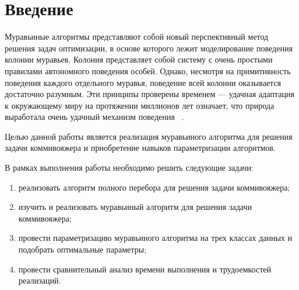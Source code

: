 \chapter*{Введение}

Муравьиные алгоритмы представляют собой новый перспективный метод решения задач оптимизации, в основе которого лежит моделирование поведения колонии муравьев. Колония представляет собой систему с очень простыми правилами автономного поведения особей. Однако, несмотря на примитивность поведения каждого отдельного муравья, поведение всей колонии оказывается достаточно разумным. Эти принципы проверены временем — удачная адаптация к окружающему миру на протяжении миллионов лет означает, что природа выработала очень удачный механизм поведения ~\cite{first_article}. 


Целью данной работы является реализация муравьиного алгоритма для решения задачи коммивояжера и приобретение навыков параметризации алгоритмов.


В рамках выполнения работы необходимо решить следующие задачи: 
\begin{enumerate}[label={\arabic*)}]
	\item реализовать алгоритм полного перебора для решения задачи коммивояжера;
	\item изучить и реализовать муравьиный алгоритм для решения задачи коммивояжера;
	\item провести параметризацию муравьиного алгоритма на трех классах данных и подобрать оптимальные параметры;
	\item провести сравнительный анализ времени выполнения и трудоемкостей реализаций.
\end{enumerate}
